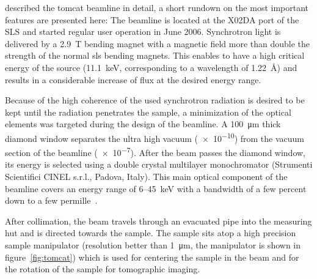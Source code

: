 \citet{Stampanoni2006a} described the \ac{tomcat} beamline in detail, a short rundown on the most important features are presented here: The beamline is located at the X02DA port of the SLS and started regular user operation in June 2006. Synchrotron light is delivered by a \SI{2.9}{\tesla} bending magnet with a magnetic field more than double the strength of the normal \ac{sls} bending magnets. This enables to have a high critical energy of the source (\SI{11.1}{\kilo\electronvolt}, corresponding to a wavelength of \SI{1.22}{\angstrom}) and results in a considerable increase of flux at the desired energy range.

Because of the high coherence of the used synchrotron radiation is desired to be kept until the radiation penetrates the sample, a minimization of the optical elements was targeted during the design of the beamline. A \SI{100}{\micro\meter} thick diamond window separates the ultra high vacuum (\SI{e-10}{\millibar}) from the vacuum section of the beamline (\SI{e-7}{\millibar}). After the beam passes the diamond window, its energy is selected using a double crystal multilayer monochromator (Strumenti Scientifici CINEL s.r.l., Padova, Italy). This main optical component of the beamline covers an energy range of 6--\SI{45}{\kilo\electronvolt} with a bandwidth of a few percent down to a few permille~\cite{Stampanoni2006a}.

After collimation, the beam travels through an evacuated pipe into the measuring hut and is directed towards the sample. The sample sits atop a high precision sample manipulator (resolution better than \SI{1}{\micro\meter}, the manipulator is shown in figure~\ref{fig:tomcat}) which is used for centering the sample in the beam and for the rotation of the sample for tomographic imaging. 


